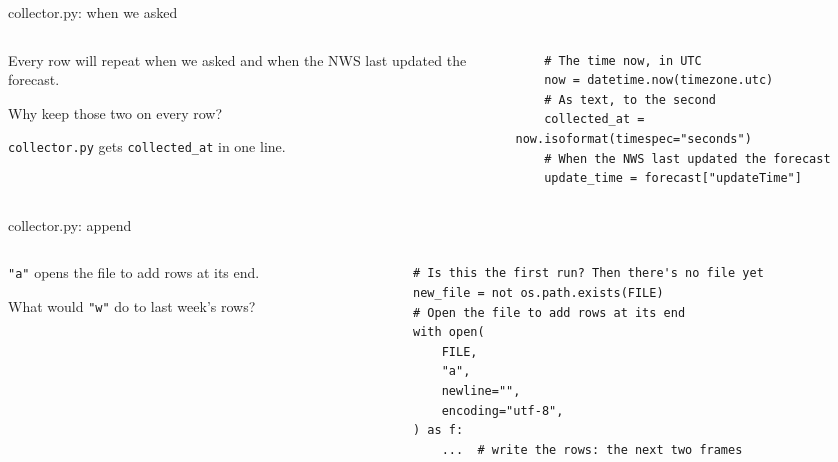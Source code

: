 \documentclass[9pt,aspectratio=169]{beamer}
\begin{document}
\begin{frame}[fragile]{collector.py: when we asked}
    \begin{columns}[T]
        \begin{column}{0.37\textwidth}
            Every row will repeat when we asked and when the NWS last updated the forecast.

            \medskip
            Why keep those two on every row?

            \medskip
            \texttt{collector.py} gets \texttt{collected\_at} in one line.
        \end{column}
        \begin{column}{0.6\textwidth}
\begin{lstlisting}
    # The time now, in UTC
    now = datetime.now(timezone.utc)
    # As text, to the second
    collected_at = now.isoformat(timespec="seconds")
    # When the NWS last updated the forecast
    update_time = forecast["updateTime"]
\end{lstlisting}
        \end{column}
    \end{columns}
\end{frame}

\begin{frame}[fragile]{collector.py: append}
    \begin{columns}[T]
        \begin{column}{0.37\textwidth}
            \texttt{"a"} opens the file to add rows at its end.

            \medskip
            What would \texttt{"w"} do to last week's rows?
        \end{column}
        \begin{column}{0.6\textwidth}
\begin{lstlisting}
    # Is this the first run? Then there's no file yet
    new_file = not os.path.exists(FILE)
    # Open the file to add rows at its end
    with open(
        FILE,
        "a",
        newline="",
        encoding="utf-8",
    ) as f:
        ...  # write the rows: the next two frames
\end{lstlisting}
        \end{column}
    \end{columns}
\end{frame}
\end{document}
